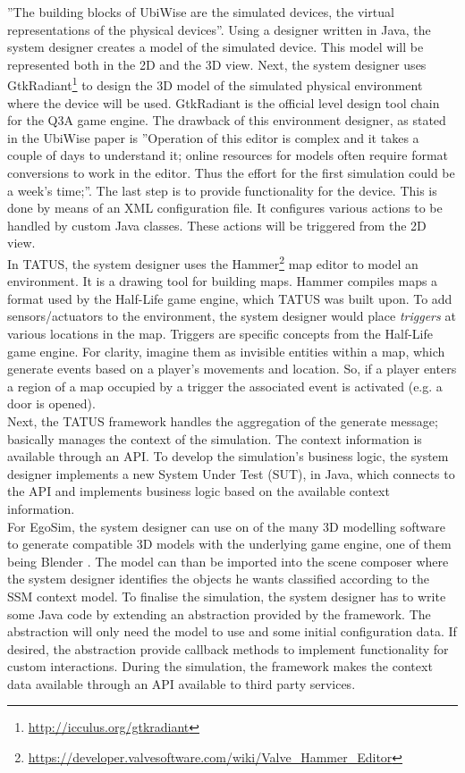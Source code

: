 ''The building blocks of UbiWise are the simulated devices, the virtual representations of the physical devices''\cite{barton2003ubiwise}. Using a designer written in Java, the system designer creates a model of the simulated device. This model will be represented both in the 2D and the 3D view. Next, the system designer uses GtkRadiant\footnote{\url{http://icculus.org/gtkradiant}} to design the 3D model of the simulated physical environment where the device will be used. GtkRadiant is the official level design tool chain for the Q3A game engine. The drawback of this environment designer, as stated in the UbiWise paper is ''Operation of this editor is complex and it takes a couple of days to understand it; online resources for models often require format conversions to work in the editor. Thus the effort for the first simulation could be a week's time;''\cite{barton2003ubiwise}. The last step is to provide functionality for the device. This is done by means of an XML configuration file. It configures various actions to be handled by custom Java classes. These actions will be triggered from the 2D view.\\

In TATUS, the system designer uses the Hammer\footnote{\url{https://developer.valvesoftware.com/wiki/Valve_Hammer_Editor}} map editor to model an environment. It is a drawing tool for building maps. Hammer compiles maps a format used by the Half-Life game engine, which TATUS was built upon. To add sensors/actuators to the environment, the system designer would place \emph{triggers} at various locations in the map. Triggers are specific concepts from the Half-Life game engine. For clarity, imagine them as invisible entities within a map, which generate events based on a player's movements and location. So, if a player enters a region of a map occupied by a trigger the associated event is activated (e.g. a door is opened).\\

Next, the TATUS framework handles the aggregation of the generate message; basically manages the context of the simulation. The context information is available through an API. To develop the simulation's business logic, the system designer implements a new System Under Test (SUT), in Java, which connects to the API and implements business logic based on the available context information.\\

For EgoSim, the system designer can use on of the many 3D modelling software to generate compatible 3D models with the underlying game engine, one of them being Blender \cite{blender:online}. The model can than be imported into the scene composer where the system designer identifies the objects he wants classified according to the SSM context model. To finalise the simulation, the system designer has to write some Java code by extending an abstraction provided by the framework. The abstraction will only need the model to use and some initial configuration data. If desired, the abstraction provide callback methods to implement functionality for custom interactions. During the simulation, the framework makes the context data available through an API available to third party services.\\

